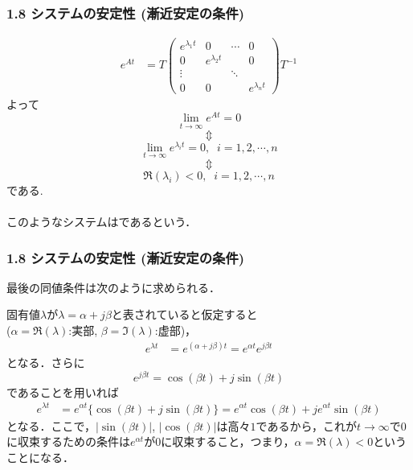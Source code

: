 \begin{frame}[t]
\frametitle{1.8 システムの安定性 (漸近安定の条件)}
\vspace*{-5mm}

\addtocounter{equation}{-1}
\begin{align}
 e^{At}
 &= T
  \left(\begin{array}{cccc}
         e^{\lambda_1 t} & 0               & \cdots & 0 \\
   0               & e^{\lambda_2 t} &        & 0 \\
   \vdots          &                 & \ddots &   \\
   0               & 0               &        & e^{\lambda_n t}
  \end{array}\right)
  T^{-1}
\end{align}
よって
\begin{equation}
 \lim_{t \rightarrow \infty} e^{At} = 0
\end{equation}
\[\Updownarrow\]
\begin{equation}
 \lim_{t \rightarrow \infty} e^{\lambda_i t } = 0, \;\;
  i = 1, 2, \cdots, n
\end{equation}
\[\Updownarrow\]
\begin{equation}
 \Re(\lambda_i) < 0, \;\; i = 1, 2, \cdots, n
\end{equation}
である.\\
\\
このようなシステムはであるという．
\end{frame}


\begin{frame}[t]
\frametitle{1.8 システムの安定性 (漸近安定の条件)}
最後の同値条件は次のように求められる．

固有値$\lambda$が$\lambda = \alpha + j \beta$と表されていると仮定すると\\
($\alpha = \Re(\lambda)$:実部, $\beta = \Im(\lambda)$:虚部)，
\begin{align*}
 e^{{\lambda} t} &= e^{(\alpha + j \beta)t} = e^{\alpha t}e^{j \beta t}
\end{align*}
となる．さらに
\begin{equation*}
 e^{j \beta t} = \cos(\beta t) + j \sin(\beta t)
\end{equation*}
であることを用いれば
\begin{align*}
 e^{{\lambda} t}  &= e^{\alpha t} \{ \cos(\beta t) + j \sin(\beta t) \} 
	= e^{\alpha t} \cos(\beta t)  + j e^{\alpha t} \sin(\beta t)
\end{align*}
となる．ここで，$|\sin(\beta t)|$, $|\cos(\beta t)|$は高々$1$であるから，これが$t \rightarrow \infty$で$0$に収束するための条件は$e^{{\alpha} t}$が$0$に収束すること，つまり，$\alpha = \Re(\lambda)<0$ということになる．
\end{frame}


